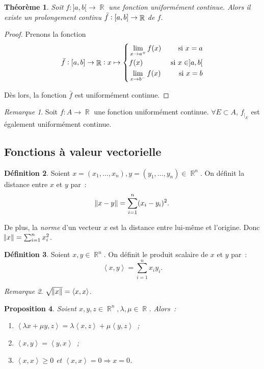 \documentclass{article}
\DeclareMathOperator{\R}{\mathbb R}
\newcommand{\scpr}[2]{{\left\langle#1, #2\right\rangle}}
\newcommand{\ab}{\interval ab}
\newcommand{\fabr}[1]{#1 : \ab \to \R}
\newtheorem{thm}{Théorème}[section]
\newtheorem{prp}[thm]{Proposition}
\theoremstyle{definition}
\newtheorem{déf}[thm]{Définition}
\theoremstyle{remark}
\newtheorem*{rmq}{Remarque}
\begin{document}
		\begin{thm} Soit $f : ]a, b[ \to \R$ une fonction uniformément continue. Alors il existe un \textit{prolongement continu} $\fabr {\bar f}$ de $f$.
		\end{thm}

		\begin{proof} Prenons la fonction 
		\[\fabr {\bar f} : x \mapsto \left\{\begin{aligned}&\lim_{x \to a^+}f(x) &\text{ si } x = a\\&f(x) &\text{ si } x \in ]a, b[\\&\lim_{x \to b^-}f(x) &\text{ si } x = b\end{aligned}\right.\]

		Dès lors, la fonction $\bar f$ est uniformément continue. \end{proof}

		\begin{rmq} Soit $f : A \to \R$ une fonction uniformément continue. $\forall E \subset A$, $f_{|_E}$ est également uniformément continue. \end{rmq}
	
	\subsection{Fonctions à valeur vectorielle}

		\begin{déf} Soient $x = (x_1, \ldots, x_n), y = (y_1, \ldots, y_n) \in \R^n$. On définit la distance entre $x$ et $y$ par~:
		\[\norm{x-y} = \sum_{i=1}^n(x_i-y_i)^2.\]

		De plus, la \textit{norme} d'un vecteur $x$ est la distance entre lui-même et l'origine. Donc $\norm x = \sum_{i=1}^nx_i^2$. \end{déf}

		\begin{déf} Soient $x, y \in \R^n$. On définit le produit scalaire de $x$ et $y$ par~:
		\[\scpr xy = \sum_{i=1}^nx_iy_i.\]
		\end{déf}

		\begin{rmq} $\sqrt {\norm x} = \scpr xx$. \end{rmq}

		\begin{prp} Soient $x, y, z \in \R^n, \lambda, \mu \in \R$. Alors~:

		\begin{enumerate}
			\item $\scpr {\lambda x + \mu y}z = \lambda \scpr xz + \mu \scpr yz$~;
			\item $\scpr xy = \scpr yx$~;
			\item $\scpr xx \geq 0$ et $\scpr xx = 0 \Rightarrow x = 0$.
		\end{enumerate}
		\end{prp}
\end{document}
